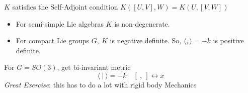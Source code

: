 \begin{teorema}
    $K$ satisfies the Self-Adjoint condition $K([U,V],W)= K(U,[V,W])$
    \begin{itemize}
        \item For semi-simple Lie algebras $K$ is non-degenerate.
        \item For compact Lie groups $G,\ K$ is negative definite. So, $\langle,\rangle=-k$ is positive definite.
    \end{itemize}
\end{teorema}

\begin{examples}
    For $G=SO(3)$, get bi-invariant metric
    $$\langle \ | \ \rangle = -k \quad [\ , \ ] \leftrightarrow x$$
    \emph{Great Exercise}: this has to do a lot with rigid body Mechanics
\end{examples}
